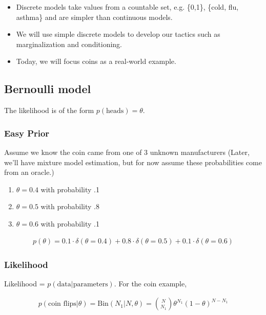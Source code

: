 \documentclass{article}
\begin{document}

\begin{itemize}
\item Discrete models take values from a countable set, e.g. \{0,1\}, \{cold, flu, asthma\} and are simpler than continuous models.
\item We will use simple discrete models to develop our tactics such as marginalization and conditioning. 
\item Today, we will focus coins as a real-world example.
\end{itemize}

\subsection{Bernoulli model}
The likelihood is of the form $p(\text{heads}) = \theta$.

\subsubsection*{Easy Prior}
Assume we know the coin came from one of 3 unknown manufacturers (Later, we'll have mixture model estimation, but for now assume these probabilities come from an oracle.)\\

\begin{enumerate}
\item $\theta = 0.4$ with probability .1 \\
\item $\theta = 0.5$ with probability .8 \\
\item $\theta = 0.6$ with probability .1 \\
\end{enumerate}

\begin{align*}
p(\theta) = 0.1 \cdot \delta(\theta = 0.4)  + 0.8 \cdot \delta(\theta = 0.5) + 0.1 \cdot \delta(\theta = 0.6)
\end{align*}

\subsubsection*{Likelihood}
Likelihood = $p(\text{data}|\text{parameters})$. For the coin example, 

\begin{align*}
p(\text{coin flips}|\theta) = \textrm{Bin}(N_1 | N, \theta) = {N \choose N_1} \theta^{N_1} (1-\theta)^{N-N_1}\\
\end{align*}
\end{document}
